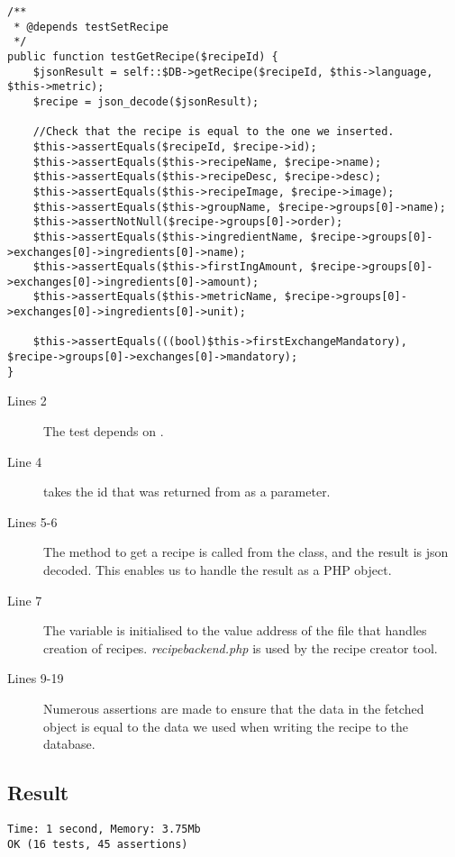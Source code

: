 \begin{lstlisting}[language=phpstyle]
/**
 * @depends testSetRecipe
 */
public function testGetRecipe($recipeId) {
    $jsonResult = self::$DB->getRecipe($recipeId, $this->language, $this->metric);
    $recipe = json_decode($jsonResult);

    //Check that the recipe is equal to the one we inserted.
    $this->assertEquals($recipeId, $recipe->id);
    $this->assertEquals($this->recipeName, $recipe->name);
    $this->assertEquals($this->recipeDesc, $recipe->desc);
    $this->assertEquals($this->recipeImage, $recipe->image);
    $this->assertEquals($this->groupName, $recipe->groups[0]->name);
    $this->assertNotNull($recipe->groups[0]->order);
    $this->assertEquals($this->ingredientName, $recipe->groups[0]->exchanges[0]->ingredients[0]->name);
    $this->assertEquals($this->firstIngAmount, $recipe->groups[0]->exchanges[0]->ingredients[0]->amount);
    $this->assertEquals($this->metricName, $recipe->groups[0]->exchanges[0]->ingredients[0]->unit);

    $this->assertEquals(((bool)$this->firstExchangeMandatory), $recipe->groups[0]->exchanges[0]->mandatory);
}
\end{lstlisting}%
\begin{description}
\item[Lines 2] The test depends on .
\item[Line 4]  takes the id that was returned from  as a parameter.
\item[Lines 5-6] The method to get a recipe is called from the  class, and the result is \ac{json} decoded. This enables us to handle the result as a PHP object.
\item[Line 7] The  variable is initialised to the value address of the file that handles creation of recipes. \textit{recipebackend.php} is used by the recipe creator tool.%
\item[Lines 9-19] Numerous assertions are made to ensure that the data in the fetched object is equal to the data we used when writing the recipe to the database.
\end{description}

\subsection*{Result}
\begin{lstlisting}[numbers=none, basicstyle=\ttfamily, caption={The result of the PHPUnit test.}]
Time: 1 second, Memory: 3.75Mb
OK (16 tests, 45 assertions)
\end{lstlisting}


